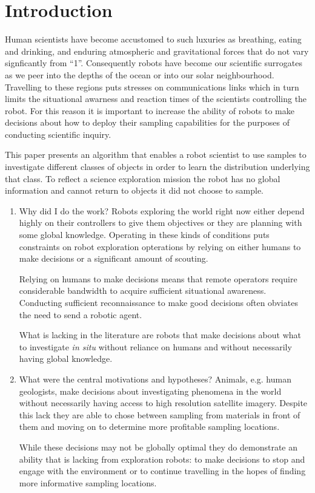 \section{Introduction}
\label{sec:intro}

Human scientists have become accustomed to such luxuries as breathing, eating
and drinking, and enduring atmospheric and gravitational forces that do not
vary signficantly from ``1''.  Consequently robots have become our scientific
surrogates as we peer into the depths of the ocean or into our solar
neighbourhood.  Travelling to these regions puts stresses on communications
links which in turn limits the situational awarness and reaction times of the
scientists controlling the robot.  For this reason it is important to increase
the ability of robots to make decisions about how to deploy their sampling
capabilities for the purposes of conducting scientific inquiry.

This paper presents an algorithm that enables a robot scientist to use samples
to investigate different classes of objects in order to learn the distribution
underlying that class.  To reflect a science exploration mission the robot has
no global information and cannot return to objects it did not choose to sample.

\begin{enumerate}
\item Why did I do the work?
	Robots exploring the world right now either depend highly on their controllers to give them objectives or they are planning with some global knowledge.  Operating in these kinds of conditions puts constraints on robot exploration opterations by relying on either humans to make decisions or a significant amount of scouting.

	Relying on humans to make decisions means that remote operators require considerable bandwidth to acquire sufficient situational awareness.  Conducting sufficient reconnaissance to make good decisions often obviates the need to send a robotic agent.

	What is lacking in the literature are robots that make decisions about what to investigate \emph{in situ} without reliance on humans and without necessarily having global knowledge.
	\item What were the central motivations and hypotheses?
	Animals, e.g. human geologists, make decisions about investigating phenomena in the world without necessarily having access to high resolution satellite imagery.  Despite this lack they are able to chose between sampling from materials in front of them and moving on to determine more profitable sampling locations.

	While these decisions may not be globally optimal they do demonstrate an ability that is lacking from exploration robots: to make decisions to stop and engage with the environment or to continue travelling in the hopes of finding more informative sampling locations.
	\end{enumerate}



